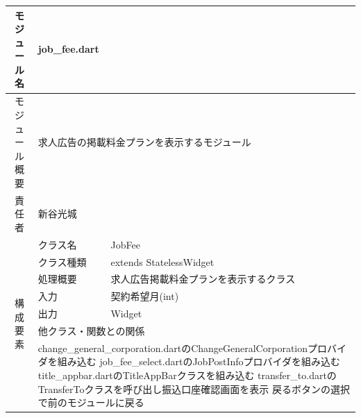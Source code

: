 \begin{table}[H]
  \centering
  \begin{tabular}{|c|l|l|} \hline
    モジュール名                & \multicolumn{2}{l|}{job\_fee.dart}                                                                \\ \hline
    モジュール概要               & \multicolumn{2}{p{12cm}|}{求人広告の掲載料金プランを表示するモジュール}                                                  \\ \hline
    責任者                   & \multicolumn{2}{l|}{新谷光城}                                                                         \\ \hline
    \multirow{7}{*}{構成要素} & クラス名                                             & JobFee                                         \\ \cline{2-3}
                          & クラス種類                                            & extends StatelessWidget                        \\ \cline{2-3}
                          & 処理概要                                             & \multicolumn{1}{p{12cm}|}{求人広告掲載料金プランを表示するクラス} \\ \cline{2-3}
                          & 入力                                               & 契約希望月(int)                                     \\ \cline{2-3}
                          & 出力                                               & Widget                                         \\ \cline{2-3}
                          & \multicolumn{2}{l|}{他クラス・関数との関係}                                                                  \\ \cline{2-3}
                          & \multicolumn{2}{p{14cm}|}{
      change\_general\_corporation.dartのChangeGeneralCorporationプロバイダを組み込む
      \newline job\_fee\_select.dartのJobPostInfoプロバイダを組み込む
      \newline title\_appbar.dartのTitleAppBarクラスを組み込む
      \newline transfer\_to.dartのTransferToクラスを呼び出し振込口座確認画面を表示
      \newline 戻るボタンの選択で前のモジュールに戻る
    }                                                                                                                         \\ \hline
  \end{tabular}
\end{table}

